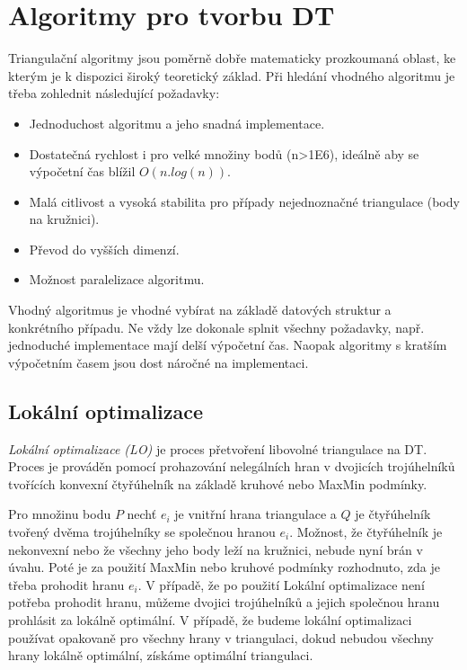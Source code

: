 \documentclass[12pt,a4paper]{article}
\begin{document}
\section{Algoritmy pro tvorbu DT}
\label{sec:algoritmy}
Triangulační algoritmy jsou poměrně dobře matematicky prozkoumaná
oblast, ke kterým je k dispozici široký teoretický základ. Při hledání
vhodného algoritmu je třeba zohlednit následující požadavky:
\begin{itemize}
\item Jednoduchost algoritmu a jeho snadná implementace.
\item Dostatečná rychlost i pro velké množiny bodů (n>1E6), ideálně aby se výpočetní čas blížil $O(n . log(n))$.
\item Malá citlivost a vysoká stabilita pro případy nejednoznačné triangulace (body na kružnici).
\item Převod do vyšších dimenzí.
\item Možnost paralelizace algoritmu.
\end{itemize}
Vhodný algoritmus je vhodné vybírat na základě datových struktur a
konkrétního případu. Ne vždy lze dokonale splnit všechny požadavky,
např. jednoduché implementace mají delší výpočetní čas. Naopak
algoritmy s kratším výpočetním časem jsou dost náročné na
implementaci.

\newpage
\subsection{Lokální optimalizace}
\emph{Lokální optimalizace (LO)} je proces přetvoření libovolné
triangulace na DT. Proces je prováděn pomocí prohazování nelegálních
hran v dvojicích trojúhelníků tvořících konvexní čtyřúhelník na
základě kruhové nebo MaxMin podmínky.

Pro množinu bodu $P$ nechť $e_i$ je vnitřní hrana triangulace a $Q$ je
čtyřúhelník tvořený dvěma trojúhelníky se společnou hranou
$e_i$. Možnost, že čtyřúhelník je nekonvexní nebo že všechny jeho body leží
na kružnici, nebude nyní brán v úvahu. Poté je za použití MaxMin nebo
kruhové podmínky rozhodnuto, zda je třeba prohodit hranu $e_i$. V
případě, že po použití Lokální optimalizace není potřeba prohodit
hranu, můžeme dvojici trojúhelníků a jejich společnou hranu prohlásit
za lokálně optimální. V případě, že budeme lokální optimalizaci
používat opakovaně pro všechny hrany v triangulaci, dokud nebudou
všechny hrany lokálně optimální, získáme optimální triangulaci.
\end{document}
